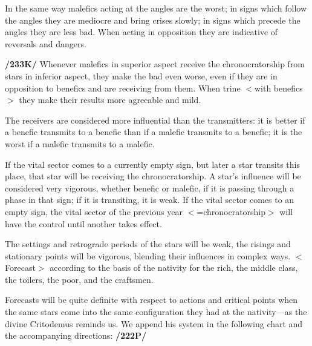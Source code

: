 In the same way malefics acting at the angles are the worst; in signs which follow the angles they are mediocre and bring crises slowly; in signs which precede the angles they are less bad. When acting in opposition they are indicative of reversals and dangers.

\textbf{/233K/} Whenever malefics in superior aspect receive the chronocratorship from stars in inferior aspect, they make the bad even worse, even if they are in opposition to benefics and are receiving from them. When trine $<$with benefics$>$ they make their results more agreeable and mild. 

The receivers are considered more influential than the transmitters: it is better if a benefic transmits to a benefic than if a malefic transmits to a benefic; it is the worst if a malefic transmits to a malefic. 

If the vital sector comes to a currently empty sign, but later a star transits this place, that star will be receiving the chronocratorship. A
star’s influence will be considered very vigorous, whether benefic or malefic, if it is passing through a phase in that sign; if it is transiting, it is weak. If the vital sector comes to an empty sign, the vital sector of the previous year $<$=chronocratorship$>$ will have the control until another takes effect.

The settings and retrograde periods of the stars will be weak, the risings and stationary points will be vigorous, blending their influences in complex ways. $<$Forecast$>$ according to the basis of the nativity for the rich, the middle class, the toilers, the poor, and the craftsmen.

Forecasts will be quite definite with respect to actions and critical points when the same stars come into the same configuration they had at the nativity—as the divine Critodemus reminds us. We append his system in the following chart and the accompanying directions: \textbf{/222P/}

